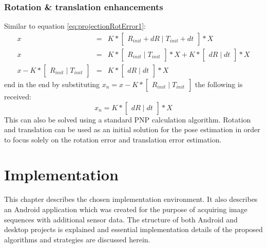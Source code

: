 \subsubsection{Rotation \& translation enhancements}
Similar to equation \ref{eq:projectionRotError1}:
\begin{equation} \label{eq:projectionRotError3}
\begin{array}{rcl}
 x & = & K * \begin{bmatrix}R_{init} + dR\mid T_{init} + dt\end{bmatrix} * X \\
 x & = & K * \begin{bmatrix}R_{init}\mid T_{init}\end{bmatrix} * X + K * \begin{bmatrix}dR\mid dt\end{bmatrix} * X \\
 x - K * \begin{bmatrix}R_{init}\mid T_{init}\end{bmatrix} & = & K * \begin{bmatrix}dR\mid dt\end{bmatrix} * X
\end{array}
\end{equation}
end in the end by substituting $x_{n} = x - K * \begin{bmatrix}R_{init}\mid T_{init}\end{bmatrix}$ the following is received: 
\begin{equation} \label{eq:projectionRotError4}
x_{n} = K * \begin{bmatrix}dR\mid dt\end{bmatrix} * X
\end{equation}
This can also be solved using a standard PNP\cite{website:poseEstimation} calculation algorithm. Rotation and translation can be used as an initial solution for the pose estimation in order to focus solely on the rotation error and translation error estimation.

\ifpdf
    \graphicspath{{figures/}{figures/comparisons}}
\else
    \graphicspath{{figures/}{figures/comparisons}}
\fi

\section{Implementation} %
This chapter describes the chosen implementation environment. It also describes an Android application which was created for the purpose of acquiring image sequences with additional sensor data. The structure of both Android and desktop projects is explained and essential implementation details of the proposed algorithms and strategies are discussed herein.


